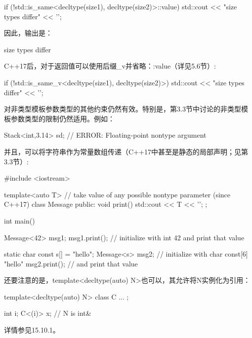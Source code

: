\begin{cpp}
if (!std::is_same<decltype(size1), decltype(size2)>::value) {
	std::cout << "size types differ" << '\n';
}
\end{cpp}

因此，输出是：

\begin{shell}
size types differ
\end{shell}

C++17后，对于返回值可以使用后缀\_v并省略：:value（详见5.6节）:

\begin{cpp}
if (!std::is_same_v<decltype(size1), decltype(size2)>) {
	std::cout << "size types differ" << '\n';
}
\end{cpp}

对非类型模板参数类型的其他约束仍然有效。特别是，第3.3节中讨论的非类型模板参数类型的限制仍然适用。例如：

\begin{cpp}
Stack<int,3.14> sd; // ERROR: Floating-point nontype argument
\end{cpp}

并且，可以将字符串作为常量数组传递（C++17中甚至是静态的局部声明；见第3.3节）:

\begin{cpp}
#include <iostream>

template<auto T> // take value of any possible nontype parameter (since C++17)
class Message {
	public:
	void print() {
		std::cout << T << '\n';
	}
};

int main()
{
	Message<42> msg1;
	msg1.print(); // initialize with int 42 and print that value
	
	static char const s[] = "hello";
	Message<s> msg2; // initialize with char const[6] "hello"
	msg2.print(); // and print that value
}
\end{cpp}

还要注意的是，template<decltype(auto) N>也可以，其允许将N实例化为引用：

\begin{cpp}
template<decltype(auto) N>
class C {
	...
};

int i;
C<(i)> x; // N is int&
\end{cpp}

详情参见15.10.1。




